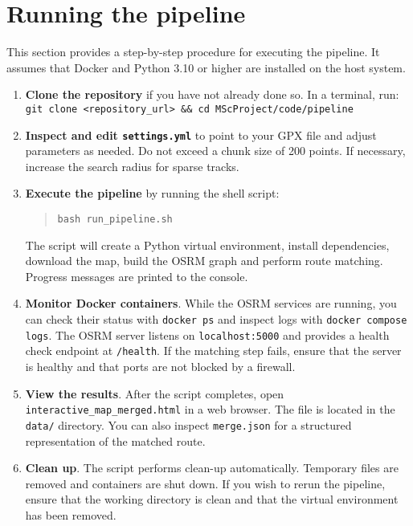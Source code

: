 \documentclass[12pt,a4paper]{article}
\begin{document}
\section{Running the pipeline}
This section provides a step-by-step procedure for executing the pipeline.  It
assumes that Docker and Python 3.10 or higher are installed on the host
system.

\begin{enumerate}
	\item \textbf{Clone the repository} if you have not already done so.  In
	      a terminal, run:\\
	      \texttt{git clone <repository\_url> \&\& cd MScProject/code/pipeline}
	\item \textbf{Inspect and edit \texttt{settings.yml}} to point to your GPX
	      file and adjust parameters as needed.  Do not exceed a chunk size of
	      200 points.  If necessary, increase the search radius for sparse
	      tracks.
	\item \textbf{Execute the pipeline} by running the shell script:
	      \begin{quote}
		      \texttt{bash run\_pipeline.sh}
	      \end{quote}
	      The script will create a Python virtual environment, install
	      dependencies, download the map, build the OSRM graph and perform route
	      matching.  Progress messages are printed to the console.
	\item \textbf{Monitor Docker containers}.  While the OSRM services are
	      running, you can check their status with \texttt{docker ps} and inspect
	      logs with \texttt{docker compose logs}.  The OSRM server listens on
	      \texttt{localhost:5000} and provides a health check endpoint at
	      \texttt{/health}.  If the matching step fails, ensure that the server
	      is healthy and that ports are not blocked by a firewall.
	\item \textbf{View the results}.  After the script completes, open
	      \texttt{interactive\_map\_merged.html} in a web browser.  The file is
	      located in the \texttt{data/} directory.  You can also inspect
	      \texttt{merge.json} for a structured representation of the matched
	      route.
	\item \textbf{Clean up}.  The script performs clean-up automatically.
	      Temporary files are removed and containers are shut down.  If you wish
	      to rerun the pipeline, ensure that the working directory is clean
	      and that the virtual environment has been removed.
\end{enumerate}
\end{document}
